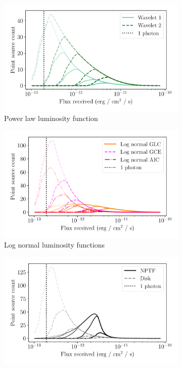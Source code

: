 \documentclass[letter,11pt]{article}
\begin{document}
\begin{figure}
    \centering
    \begin{subfigure}[b]{0.49\textwidth}
        \includegraphics[width=\textwidth]{figs/power-law-sensitivity-hist.pdf}
        \caption{Power law luminosity function}
    \end{subfigure}
    \hfill
    \begin{subfigure}[b]{0.49\textwidth}
        \includegraphics[width=\textwidth]{figs/log-normal-sensitivity-hist.pdf}
        \caption{Log normal luminosity functions }
    \end{subfigure}
    \hfill
    \begin{subfigure}[b]{0.49\textwidth}
        \includegraphics[width=\textwidth]{figs/nptf-sensitivity-hist.pdf}

\end{subfigure}
\end{figure}
\end{document}

